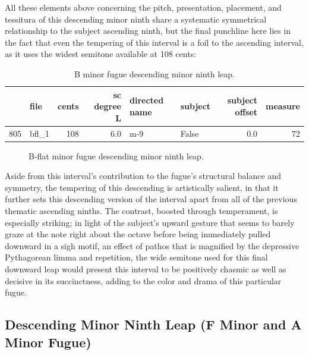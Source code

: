 All these elements above concerning the pitch, presentation, placement,
and tessitura of this descending minor ninth share a systematic
symmetrical relationship to the subject ascending ninth, but the final
punchline here lies in the fact that even the tempering of this interval
is a foil to the ascending interval, as it uses the widest semitone
available at 108 cents:

\begin{singlespace}
\begin{table}[H]
\centering
\tiny
\begin{tabular}{|llrrllrr|}
\hline
\textbf{{}} & \textbf{  file} & \textbf{ cents} & \textbf{ sc degree L} & \textbf{directed name} & \textbf{subject} & \textbf{ subject offset} & \textbf{ measure }\\
\hline
805 &  bfl\_1 &    108 &          6.0 &           m-9 &   False &             0.0 &       72 \\
\hline
\end{tabular}
\caption{B minor fugue descending minor ninth leap. }
\end{table}
\normalsize
\end{singlespace}




\begin{figure}[H]
\vspace{1.5em}
    \centering
    \caption{B-flat minor fugue descending minor ninth leap.}
\end{figure}    Aside from this interval's contribution to the fugue's structural
balance and symmetry, the tempering of this descending is artistically
salient, in that it further sets this descending version of the interval
apart from all of the previous thematic ascending ninths. The contrast,
boosted through temperament, is especially striking; in light of the
subject's upward gesture that seems to barely graze at the note right
about the octave before being immediately pulled downward in a sigh
motif, an effect of pathos that is magnified by the depressive
Pythagorean limma and repetition, the wide semitone used for this final
downward leap would present this interval to be positively chasmic as
well as decisive in its succinctness, adding to the color and drama of
this particular fugue.

    \subsection{Descending Minor Ninth Leap (F Minor and A Minor
Fugue)}\label{descending-minor-ninth-leap-f-minor-and-a-minor-fugue}

